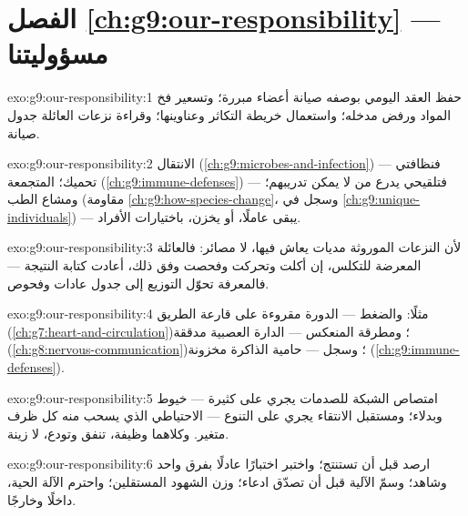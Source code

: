\section*{الفصل \ref{ch:g9:our-responsibility} --- مسؤوليتنا}

\begin{solution}{exo:g9:our-responsibility:1}
حفظ العقد اليومي بوصفه صيانة أعضاء مبررة؛ وتسعير فخ
المواد ورفض مدخله؛ واستعمال خريطة التكاثر وعناوينها؛
وقراءة نزعات العائلة جدول صيانة.
\end{solution}

\begin{solution}{exo:g9:our-responsibility:2}
الانتقال (\cref{ch:g9:microbes-and-infection}) ---
فنظافتي تحميك؛  المتجمعة
(\cref{ch:g9:immune-defenses}) --- فتلقيحي يدرع من لا
يمكن تدريبهم؛ ومشاع الطب (مقاومة
\cref{ch:g9:how-species-change}، وسجل  في
\cref{ch:g9:unique-individuals}) --- يبقى عاملًا، أو
يخزن، باختيارات الأفراد.
\end{solution}

\begin{solution}{exo:g9:our-responsibility:3}
لأن النزعات الموروثة مديات يعاش فيها، لا مصائر: فالعائلة
المعرضة للتكلس، إن أكلت وتحركت وفحصت وفق ذلك، أعادت
كتابة النتيجة --- فالمعرفة تحوّل التوزيع إلى جدول عادات
وفحوص.
\end{solution}

\begin{solution}{exo:g9:our-responsibility:4}
مثلًا:  والضغط --- الدورة مقروءة على قارعة الطريق
(\cref{ch:g7:heart-and-circulation})؛ ومطرقة المنعكس ---
الدارة العصبية مدققة
(\cref{ch:g8:nervous-communication})؛ وسجل  ---
حامية الذاكرة مخزونة
(\cref{ch:g9:immune-defenses}).
\end{solution}

\begin{solution}{exo:g9:our-responsibility:5}
امتصاص الشبكة للصدمات يجري على  كثيرة --- خيوط
وبدلاء؛ ومستقبل الانتقاء يجري على التنوع --- الاحتياطي
الذي يسحب منه كل ظرف متغير. وكلاهما وظيفة، تنفق وتودع،
لا زينة.
\end{solution}

\begin{solution}{exo:g9:our-responsibility:6}
ارصد قبل أن تستنتج؛ واختبر اختبارًا عادلًا بفرق واحد
وشاهد؛ وسمّ الآلية قبل أن تصدّق ادعاء؛ وزن الشهود
المستقلين؛ واحترم الآلة الحية، داخلًا وخارجًا.
\end{solution}

